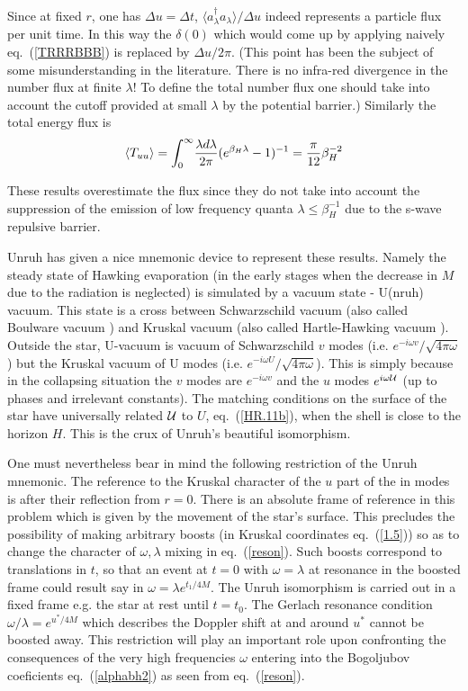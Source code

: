 \documentclass[12pt,oneside]{report}
\def\om{\omega	}
\def\la{\lambda}
\begin{document}
Since at fixed $r$, one has $ \Delta u = \Delta t$, 
$ \langle a^\dagger_\la a_\la \rangle 
/ \Delta u$ indeed represents a particle flux 
per unit time. In this way the $\delta(0)$ which would come up by applying
naively eq.~(\ref{TRRRBBB}) is replaced by $\Delta u /2 \pi$. (This point has
been the subject of some misunderstanding in the literature. There is no
infra-red divergence in the number flux at finite $\la$! To define the total
number flux one should take into account the cutoff provided at small $\la$ by
the potential barrier.)
Similarly the
total energy flux is 
\begin {eqnarray}
\langle T_{uu} \rangle = 
\int _{0} ^{\infty} \! {\lambda d \lambda \over 2 \pi}
( e^{
\beta_H \lambda} - 1 ) ^{-1} = { \pi \over 12} \beta_H^{-2} \label {1.38}
\end {eqnarray}

These results overestimate the flux since they do not take into account the
suppression of the emission of low frequency quanta $ \lambda \leq
\beta_H^{-1}$ due to the s-wave repulsive barrier. 

Unruh \cite{Unru1} has given a nice mnemonic device to represent these
results. Namely the steady state of Hawking evaporation (in the early stages
when the decrease in $M$ due to the radiation is neglected) is simulated by a
vacuum state - U(nruh) vacuum. This state is a cross between Schwarzschild
vacuum (also called Boulware vacuum \cite{Boul1}) and Kruskal vacuum (also called
Hartle-Hawking vacuum \cite{HaHa}). Outside the star, U-vacuum is vacuum of
Schwarzschild $v$
 modes (i.e. $e^{-i \omega v}/ \sqrt{4 \pi \omega}$) but the
Kruskal vacuum of U modes (i.e. $e^{-i \omega U}/ \sqrt{4 \pi \omega}$). 
This is simply
because in the collapsing situation the $v$ modes are $ e^{-i\omega v}$  
and the $u$ 
modes $ e^{i \omega  {\cal{U}} }$ (up to phases and irrelevant constants). The 
matching
conditions on the surface of the star have universally
related $ {\cal{U}} $ to 
$U$, eq.~(\ref{HR.11b}), when the shell is close to the horizon $H$.
This is the crux of Unruh's beautiful
isomorphism. 

One must nevertheless bear in mind the following
restriction of the Unruh mnemonic.
The reference to the Kruskal character of the $u$ part of the in modes is
after their reflection from $ r = 0 $. There is an absolute frame of
reference in this problem which is given by the movement of the star's
surface. This precludes the possibility of making arbitrary boosts 
(in Kruskal coordinates eq.~(\ref{1.5})) so as to
change the character of $ \omega, \lambda$ mixing in eq.~(\ref{reson}). 
Such boosts correspond to
translations in $t$, so that an event at $ t = 0 $
with $ \omega = \lambda$ at resonance in the boosted frame could result say in
$ \omega = \lambda e^{t_1/4M}$. The Unruh isomorphism is carried out in a
fixed frame e.g. the star at rest until $ t = t_0 $. 
The Gerlach resonance condition $ \omega / \lambda = e^{u^*/4M}$ 
which describes the
Doppler shift at and around $u^*$ cannot be boosted away.
This restriction will play an important role upon confronting the 
consequences of the very high frequencies $\om$
entering into the Bogoljubov coeficients eq.~(\ref{alphabh2})
as seen from eq.~(\ref{reson}).
\end{document}
